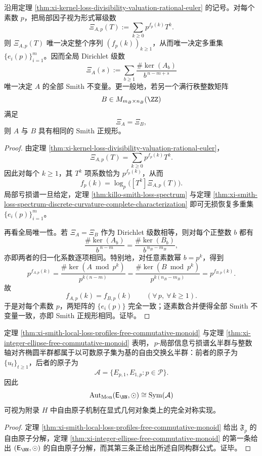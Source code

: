 \begin{theorem}\label{thm:xi-smith-local-euler-complete-invariant}
沿用定理 \ref{thm:xi-kernel-loss-divisibility-valuation-rational-euler} 的记号。对每个素数 \(p\)，把局部因子视为形式幂级数
\[
\Xi_{A,p}(T)
:=
\sum_{k\ge 0}p^{f_p(k)}T^k.
\]
则 \(\Xi_{A,p}(T)\) 唯一决定整个序列 \((f_p(k))_{k\ge 1}\)，从而唯一决定多重集 \(\{e_i(p)\}_{i=1}^{m}\)。因而全局 Dirichlet 级数
\[
\Xi_A(s)
:=
\sum_{b\ge 1}\frac{\#\ker(A_b)}{b^{\,n-m+s}}
\]
唯一决定 \(A\) 的全部 Smith 不变量。更一般地，若另一个满行秩整数矩阵
\[
B\in M_{m_B\times n_B}(\ZZ)
\]
满足
\[
\Xi_A=\Xi_B,
\]
则 \(A\) 与 \(B\) 具有相同的 Smith 正规形。
\end{theorem}
\begin{proof}
由定理 \ref{thm:xi-kernel-loss-divisibility-valuation-rational-euler}，
\[
\Xi_{A,p}(T)=\sum_{k\ge 0}p^{f_p(k)}T^k.
\]
因此对每个 \(k\ge 1\)，其 \(T^k\) 项系数恰为 \(p^{f_p(k)}\)，从而
\[
f_p(k)=\log_p\!\bigl([T^k]\Xi_{A,p}(T)\bigr).
\]
局部亏损谱一旦给定，定理 \ref{thm:killo-smith-loss-spectrum} 与定理 \ref{thm:xi-smith-loss-spectrum-discrete-curvature-complete-characterization} 即可无损恢复多重集 \(\{e_i(p)\}_{i=1}^{m}\)。

再看全局唯一性。若 \(\Xi_A=\Xi_B\) 作为 Dirichlet 级数相等，则对每个正整数 \(b\) 都有
\[
\frac{\#\ker(A_b)}{b^{\,n-m}}
=
\frac{\#\ker(B_b)}{b^{\,n_B-m_B}},
\]
亦即两者的归一化系数逐项相同。特别地，对任意素数幂 \(b=p^k\)，得到
\[
p^{f_{A,p}(k)}
=
\frac{\#\ker(A\bmod p^k)}{p^{k(n-m)}}
=
\frac{\#\ker(B\bmod p^k)}{p^{k(n_B-m_B)}}
=
p^{f_{B,p}(k)}.
\]
故
\[
f_{A,p}(k)=f_{B,p}(k)\qquad(\forall\,p,\ \forall\,k\ge 1).
\]
于是对每个素数 \(p\)，两矩阵的 \(\{e_i(p)\}\) 完全一致；逐素数合并便得全部 Smith 不变量一致，亦即 Smith 正规形相同。证毕。
\end{proof}

\begin{corollary}[自由原子结构在整数轴对齐椭圆半群中的几何实现]\label{cor:xi-free-atomic-structure-ellipse-realization}
定理 \ref{thm:xi-smith-local-loss-profiles-free-commutative-monoid} 与定理 \ref{thm:xi-integer-ellipse-free-commutative-monoid} 表明，\(\,p\)-局部信息亏损谱幺半群与整数轴对齐椭圆半群都属于以可数原子集为基的自由交换幺半群：前者的原子为 \(\{u_t\}_{t\ge 1}\)，后者的原子为
\[
\mathcal A=\{E_{p,1},E_{1,p}:p\in\mathcal P\}.
\]
因此
\[
\operatorname{Aut}_{\mathrm{Mon}}(\mathsf E_{\NN},\odot)\cong \mathrm{Sym}(\mathcal A)
\]
可视为附录 \(H\) 中自由原子机制在显式几何对象类上的完全对称实现。
\end{corollary}
\begin{proof}
定理 \ref{thm:xi-smith-local-loss-profiles-free-commutative-monoid} 给出 \(\mathfrak F_p\) 的自由原子分解，定理 \ref{thm:xi-integer-ellipse-free-commutative-monoid} 的第一条给出 \((\mathsf E_{\NN},\odot)\) 的自由原子分解，而其第三条正给出所述自同构群公式。证毕。
\end{proof}

